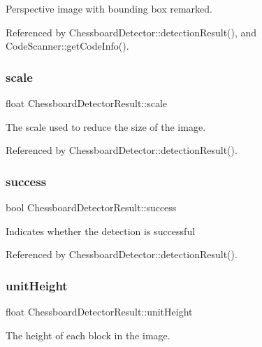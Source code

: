 Perspective image with bounding box remarked. 

Referenced by Chessboard\+Detector\+::detection\+Result(), and Code\+Scanner\+::get\+Code\+Info().

\mbox{\label{structChessboardDetectorResult_abf6c377b55ae8db5b653cb581b0baf30}} 
\subsubsection{\texorpdfstring{scale}{scale}}
{\footnotesize\ttfamily float Chessboard\+Detector\+Result\+::scale}

The scale used to reduce the size of the image. 

Referenced by Chessboard\+Detector\+::detection\+Result().

\mbox{\label{structChessboardDetectorResult_a7f5e6c90f4d7b3c948d1e1ddab933df9}} 
\subsubsection{\texorpdfstring{success}{success}}
{\footnotesize\ttfamily bool Chessboard\+Detector\+Result\+::success}

Indicates whether the detection is successful 

Referenced by Chessboard\+Detector\+::detection\+Result().

\mbox{\label{structChessboardDetectorResult_a95e32f26ef920afcc1e64af548120285}} 
\subsubsection{\texorpdfstring{unit\+Height}{unitHeight}}
{\footnotesize\ttfamily float Chessboard\+Detector\+Result\+::unit\+Height}

The height of each block in the image. 

